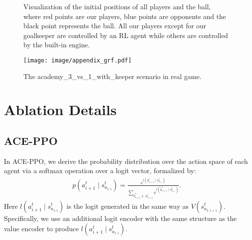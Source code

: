 \documentclass[letterpaper]{article} \usepackage{aaai23}  \usepackage{times}  \usepackage{helvet}  \usepackage{courier}  \usepackage[hyphens]{url}  \usepackage{graphicx} \urlstyle{rm} \def\UrlFont{\rm}  \usepackage{natbib}  \usepackage{caption} \frenchspacing  \setlength{\pdfpagewidth}{8.5in} \setlength{\pdfpageheight}{11in} \usepackage{algorithm}
\begin{document}
\begin{figure}[t]
  \centering
{}
\hspace{3ex}
  \caption{Visualization of the initial positions of all players and the ball, where red points are our players, blue points are opponents and the black point represents the ball. All our players except for our goalkeeper are controlled by an RL agent while others are controlled by the built-in engine.}
 \label{appendix:grf_vis}
 \vspace{-3ex}
\end{figure}

\begin{figure*}[h]
    \centering
    \texttt{[image: image/appendix\_grf.pdf]}
\vspace{-0.2cm}
    \caption{The academy\_3\_vs\_1\_with\_keeper scenario in real game.
}
\vspace{-3ex}
    \label{appendix:grf}
\end{figure*}

\section{Ablation Details}
\label{sec: ablation}
\subsection{ACE-PPO}
In ACE-PPO, we derive the probability distribution over the action space of each agent via a softmax operation over a logit vector, formalized by:
\begin{gather}
\label{ppo_prob}
   p\left(a_{i+1}^t \mid s_{a_{1:i}}^t\right)=
   \frac{e^{l\left(a_{i+1}^t \mid s_{a_{1:i}}^t\right)}}{\sum_{\tilde{a}_{i+1}^t \in \mathcal{A}_{i+1}}e^{l\left(\tilde{a}_{i+1}^t \mid s_{a_{1:i}}^t\right)}}.
\end{gather}
Here $l\left(a_{i+1}^t \mid s_{a_{1:i}}^t\right)$ is the logit generated in the same way as $V\left(s_{a_{1:i+1}}^t\right)$. Specifically, we use an additional logit encoder with the same structure as the value encoder to produce $l\left(a_{i+1}^t \mid s_{a_{1:i}}^t\right)$.
\end{document}
